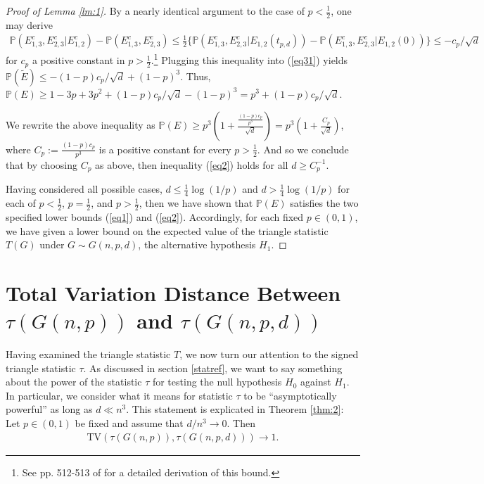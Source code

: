 \documentclass{article}
\newenvironment{manualtheorem}[1]{%
  \renewcommand\themanualtheoreminner{#1}%
  \manualtheoreminner
}{\endmanualtheoreminner}
\begin{document}
\begin{proof}[Proof of Lemma \ref{lm:1}]
By a nearly identical argument to the case of $p < \frac{1}{2}$, one may derive
\begin{align*}
    \mathbb{P}(E_{1,3}^c, E_{2,3}^c|E_{1,2}^c) - \mathbb{P}(E_{1,3}^c, E_{2,3}^c) \leq \frac{1}{2} \{\mathbb{P}(E_{1,3}^c, E_{2,3}^c|E_{1,2}(t_{p,d})) - \mathbb{P}(E_{1,3}^c, E_{2,3}^c|E_{1,2}(0)) \} \leq -c_p/\sqrt{d}
\end{align*}
for $c_p$ a positive constant in $p > \frac{1}{2}$.\footnote{See pp. 512-513 of \cite{bubeck2016testing} for a detailed derivation of this bound.} Plugging this inequality into (\ref{eq31}) yields $\mathbb{P}(\widetilde{E}) \leq -(1-p)c_p/\sqrt{d} + (1-p)^3$. Thus, $\mathbb{P}(E) \geq  1 - 3p + 3p^2 + (1-p)c_p/\sqrt{d} - (1-p)^3 = p^3 + (1-p)c_p/\sqrt{d}$.

We rewrite the above inequality as $\mathbb{P}(E) \geq p^3 \left(1 + \frac{\frac{(1-p)c_p}{p^3}}{\sqrt{d}} \right) = p^3 \left(1 + \frac{C_p}{\sqrt{d}} \right)$, where $C_p := \frac{(1-p)c_p}{p^3}$ is a positive constant for every $p > \frac{1}{2}.$ And so we conclude that by choosing $C_p$ as above, then inequality (\ref{eq2}) holds for all $d \geq C_p^{-1}$.

Having considered all possible cases, $d \leq \frac{1}{4}\log(1/p)$ and $d > \frac{1}{4}\log(1/p)$ for each of $p < \frac{1}{2}$, $p=\frac{1}{2}$, and $p > \frac{1}{2}$, then we have shown that $\mathbb{P}(E)$ satisfies the two specified lower bounds (\ref{eq1}) and (\ref{eq2}). Accordingly, for each fixed $p \in (0, 1)$, we have given a lower bound on the expected value of the triangle statistic $T(G)$ under $G \sim G(n, p,d)$, the alternative hypothesis $H_1$.
\end{proof}

\section{Total Variation Distance Between $\tau(G(n, p))$ and $\tau(G(n, p, d))$}\label{totalvarref}

Having examined the triangle statistic $T$, we now turn our attention to the signed triangle statistic $\tau$. As discussed in section \ref{statref}, we want to say something about the power of the statistic $\tau$ for testing the null hypothesis $H_0$ against $H_1$. In particular, we consider what it means for statistic $\tau$ to be \enquote{asymptotically powerful} as long as $d \ll n^3$. This statement is explicated in Theorem \ref{thm:2}:
\begin{manualtheorem}{2}\label{thm:2} Let $p \in (0,1)$ be fixed and assume that $d/n^3 \rightarrow 0$. Then 
\begin{align*}
    \text{TV}(\tau(G(n,p)), \tau(G(n,p, d))) \rightarrow 1.
\end{align*}
\end{manualtheorem}
\end{document}
